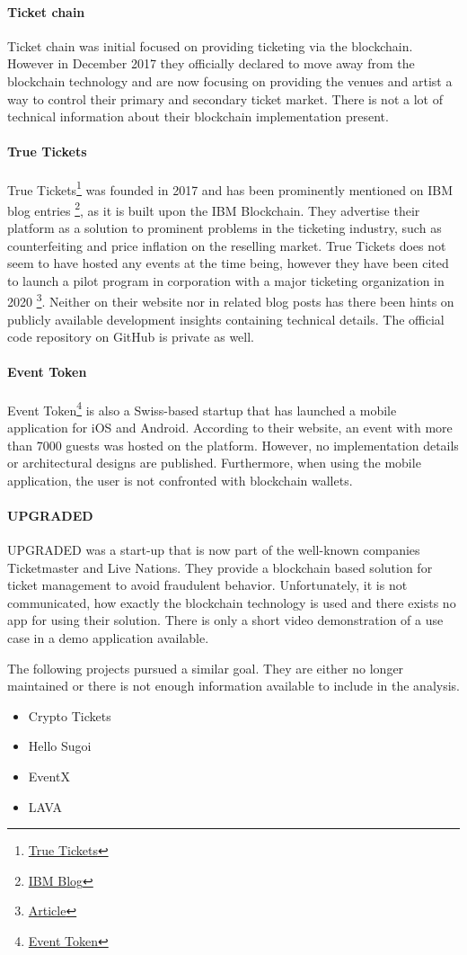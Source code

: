 \paragraph{Ticket chain}
Ticket chain\cite{TicketChain} was initial  focused on providing ticketing via the blockchain. However in December 2017 they officially declared to move away from the blockchain technology and are now focusing on providing the venues and artist a way to control their primary and secondary ticket market. There is not a lot of technical information about their blockchain implementation present. 

\paragraph{True Tickets}
True Tickets\footnote{\href{https://true-tickets.com/}{True Tickets}} was founded in 2017 and has been prominently mentioned on IBM blog entries \footnote{\href{https://www.ibm.com/blogs/client-voices/blockchain-helping-bands-fans/}{IBM Blog}}, as it is built upon the IBM Blockchain. They advertise their platform as a solution to prominent problems in the ticketing industry, such as counterfeiting and price inflation on the reselling market. True Tickets does not seem to have hosted any events at the time being, however they have been cited to launch a pilot program in corporation with a major ticketing organization in 2020 \footnote{\href{https://finance.yahoo.com/news/true-tickets-bringing-blockchain-broadway-122210870.html}{Article}}.
Neither on their website nor in related blog posts has there been hints on publicly available development insights containing technical details. The official code repository on GitHub is private as well.

\paragraph{Event Token}
Event Token\footnote{\href{https://www.eventtoken.ch/}{Event Token}} is also a Swiss-based startup that has launched a mobile application for iOS and Android. According to their website, an event with more than 7000 guests was hosted on the platform. However, no implementation details or architectural designs are published. Furthermore, when using the mobile application, the user is not confronted with blockchain wallets. 

\paragraph{UPGRADED} UPGRADED\cite{UPGRADED} was a start-up that is now part of the well-known companies Ticketmaster and Live Nations. They provide a blockchain based solution for ticket management to avoid fraudulent behavior. Unfortunately, it is not communicated, how exactly the blockchain technology is used and there exists no app for using their solution. There is only a short video demonstration of a use case in a demo application available.

The following projects pursued a similar goal. They are either no longer maintained or there is not enough information available to include in the analysis.
\begin{itemize}
    \item Crypto Tickets
    \item Hello Sugoi
    \item EventX
    \item LAVA
\end{itemize}
